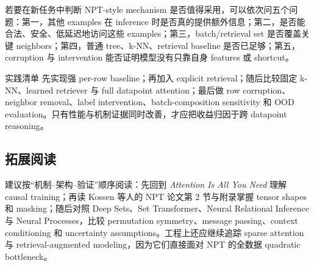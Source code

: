 若要在新任务中判断 NPT-style mechanism 是否值得采用，可以依次问五个问题：第一，其他 examples 在 inference 时是否真的提供额外信息；第二，是否能合法、安全、低延迟地访问这些 examples；第三，batch/retrieval set 是否覆盖关键 neighbors；第四，普通 tree、k-NN、retrieval baseline 是否已足够；第五，corruption 与 intervention 能否证明模型没有只靠自身 features 或 shortcut。

\begin{knowledgebox}{实践清单}
先实现强 per-row baseline；再加入 explicit retrieval；随后比较固定 k-NN、learned retriever 与 full datapoint attention；最后做 row corruption、neighbor removal、label intervention、batch-composition sensitivity 和 OOD evaluation。只有性能与机制证据同时改善，才应把收益归因于跨 datapoint reasoning。
\end{knowledgebox}

\subsection{拓展阅读}

建议按“机制--架构--验证”顺序阅读：先回到 \emph{Attention Is All You Need} 理解 causal training；再读 Kossen 等人的 NPT 论文第 2 节与附录掌握 tensor shapes 和 masking；随后对照 Deep Sets、Set Transformer、Neural Relational Inference 与 Neural Processes，比较 permutation symmetry、message passing、context conditioning 和 uncertainty assumptions。工程上还应继续追踪 sparse attention 与 retrieval-augmented modeling，因为它们直接面对 NPT 的全数据 quadratic bottleneck。



